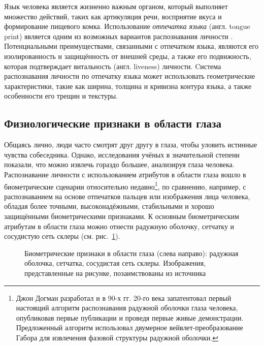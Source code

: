 \documentclass[12pt]{book}
\begin{document}
\large{Язык человека является жизненно важным органом, который выполняет множество действий, таких как артикуляция речи, восприятие вкуса и формирование пищевого комка. Использование \textit{отпечатка языка} (англ. tongue print) является одним из возможных вариантов распознавания личности \cite{unar_2014, bhattacharyya_2023}. Потенциальными преимуществами, связанными с отпечатком языка, являются его изолированность и защищённость от внешней среды, а также его подвижность, которая подтверждает витальность (англ. liveness) личности. Cистема распознавания личности по отпечатку языка может использовать геометрические характеристики, такие как ширина, толщина и кривизна контура языка, а также особенности его трещин и текстуры.}

\subsection{Физиологические признаки в области глаза}

\large{Общаясь лично, люди часто смотрят друг другу в глаза, чтобы уловить истинные чувства собеседника. Однако, исследования учёных в значительной степени показали, что можно извлечь гораздо большее, анализируя глаза человека. Распознавание личности с использованием атрибутов в области глаза вошло в биометрические сценарии относительно недавно\footnote{Джон Догман разработал и в 90-х гг. 20-го века запатентовал первый настоящий алгоритм распознавания радужной оболочки глаза человека, опубликовав первые публикации и проведя первые живые демонстрации. Предложенный алгоритм использовал двумерное вейвлет-преобразование Габора для извлечения фазовой структуры радужной оболочки.}, по сравнению, например, с распознаванием на основе отпечатков пальцев или изображения лица человека, обладая более точными, высоконадёжными, стабильными и хорошо защищёнными биометрическими признаками. К основным биометрическим атрибутам в области глаза можно отнести радужную оболочку, сетчатку и сосудистую сеть склеры (см. рис.~\ref{fig:figure_1_4}).}

\begin{figure}[h]
\caption{Биометрические признаки в области глаза (слева направо): радужная оболочка, сетчатка, сосудистая сеть склеры. Изображения, представленные на рисунке, позаимствованы из источника \cite{unar_2014}}
\label{fig:figure_1_4}
\end{figure}
\end{document}
